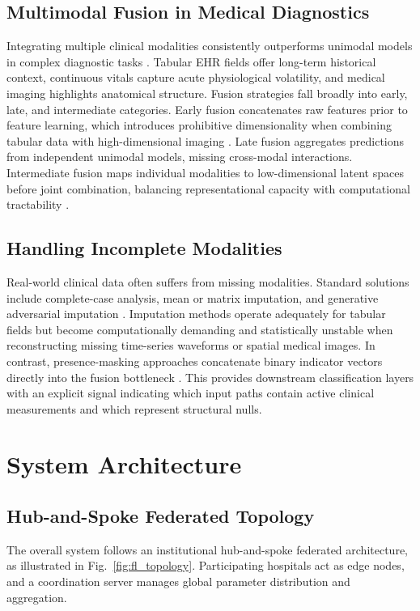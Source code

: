 \documentclass[10pt,conference]{IEEEtran}
\begin{document}
\subsection{Multimodal Fusion in Medical Diagnostics}
Integrating multiple clinical modalities consistently outperforms unimodal models in complex diagnostic tasks \cite{huang2020fusion, esteva2019guide}. Tabular EHR fields offer long-term historical context, continuous vitals capture acute physiological volatility, and medical imaging highlights anatomical structure. Fusion strategies fall broadly into early, late, and intermediate categories. Early fusion concatenates raw features prior to feature learning, which introduces prohibitive dimensionality when combining tabular data with high-dimensional imaging \cite{baltruvsaitis2018multimodal}. Late fusion aggregates predictions from independent unimodal models, missing cross-modal interactions. Intermediate fusion maps individual modalities to low-dimensional latent spaces before joint combination, balancing representational capacity with computational tractability \cite{ramachandram2017deep}.

\subsection{Handling Incomplete Modalities}
Real-world clinical data often suffers from missing modalities. Standard solutions include complete-case analysis, mean or matrix imputation, and generative adversarial imputation \cite{yoon2018gain}. Imputation methods operate adequately for tabular fields but become computationally demanding and statistically unstable when reconstructing missing time-series waveforms or spatial medical images. In contrast, presence-masking approaches concatenate binary indicator vectors directly into the fusion bottleneck \cite{lee2019set, ma2021smil}. This provides downstream classification layers with an explicit signal indicating which input paths contain active clinical measurements and which represent structural nulls.

\section{System Architecture}

\subsection{Hub-and-Spoke Federated Topology}
The overall system follows an institutional hub-and-spoke federated architecture, as illustrated in Fig.~\ref{fig:fl_topology}. Participating hospitals act as edge nodes, and a coordination server manages global parameter distribution and aggregation.
\end{document}
